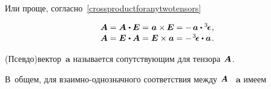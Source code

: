 \begin{otherlanguage}{russian}
Или проще, согласно~\eqref{crossproductforanytwotensors}

\nopagebreak\vspace{-0.1em}\begin{equation*}\begin{array}{c}
\bm{A} = \bm{A} \hspace{.1ex} \dotp \UnitDyad = \hspace{.1ex} \bm{a} \times \hspace{-0.1ex} \UnitDyad = - \hspace{.3ex} \bm{a} \dotp \levicivitatensor
\hspace{.1ex} ,
\\[.1em]
\bm{A} = \UnitDyad \hspace{.1ex} \dotp \bm{A} = \UnitDyad \times \bm{a} = - \hspace{.2ex} \levicivitatensor \dotp \bm{a}
\hspace{.2ex} .
\end{array}\end{equation*}

(Псевдо)вектор~$\bm{a}$ называется сопутствующим для тензора~${\hspace{-0.2ex}\bm{A}}$.

В~общем, для взаимно\hbox{-}однозначного соответствия между~${\hspace{-0.2ex}\bm{A}}$ ~$\bm{a}$ имеем


\end{otherlanguage}
